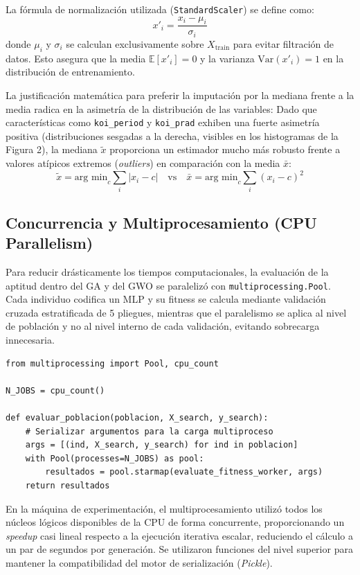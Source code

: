 \documentclass[12pt, letterpaper]{article}
\begin{document}
La fórmula de normalización utilizada (\texttt{StandardScaler}) se define como:
\[
x'_i = \frac{x_i - \mu_i}{\sigma_i}
\]
donde $\mu_i$ y $\sigma_i$ se calculan exclusivamente sobre $X_{\text{train}}$ para evitar filtración de datos. Esto asegura que la media $\mathbb{E}[x'_i] = 0$ y la varianza $\text{Var}(x'_i) = 1$ en la distribución de entrenamiento.

La justificación matemática para preferir la imputación por la mediana frente a la media radica en la asimetría de la distribución de las variables: Dado que características como \texttt{koi\_period} y \texttt{koi\_prad} exhiben una fuerte asimetría positiva (distribuciones sesgadas a la derecha, visibles en los histogramas de la Figura 2), la mediana $\tilde{x}$ proporciona un estimador mucho más robusto frente a valores atípicos extremos (\textit{outliers}) en comparación con la media $\bar{x}$:
\[
\tilde{x} = \text{arg min}_c \sum_i |x_i - c| \quad \text{vs} \quad
\bar{x} = \text{arg min}_c \sum_i (x_i - c)^2
\]

\subsection{Concurrencia y Multiprocesamiento (CPU Parallelism)}
Para reducir drásticamente los tiempos computacionales, la evaluación de la aptitud dentro del GA y del GWO se paralelizó con \texttt{multiprocessing.Pool}. Cada individuo codifica un MLP y su fitness se calcula mediante validación cruzada estratificada de 5 pliegues, mientras que el paralelismo se aplica al nivel de población y no al nivel interno de cada validación, evitando sobrecarga innecesaria.

\begin{lstlisting}
from multiprocessing import Pool, cpu_count

N_JOBS = cpu_count()

def evaluar_poblacion(poblacion, X_search, y_search):
    # Serializar argumentos para la carga multiproceso
    args = [(ind, X_search, y_search) for ind in poblacion]
    with Pool(processes=N_JOBS) as pool:
        resultados = pool.starmap(evaluate_fitness_worker, args)
    return resultados
\end{lstlisting}

En la máquina de experimentación, el multiprocesamiento utilizó todos los núcleos lógicos disponibles de la CPU de forma concurrente, proporcionando un \textit{speedup} casi lineal respecto a la ejecución iterativa escalar, reduciendo el cálculo a un par de segundos por generación. Se utilizaron funciones del nivel superior para mantener la compatibilidad del motor de serialización (\textit{Pickle}).
\end{document}
